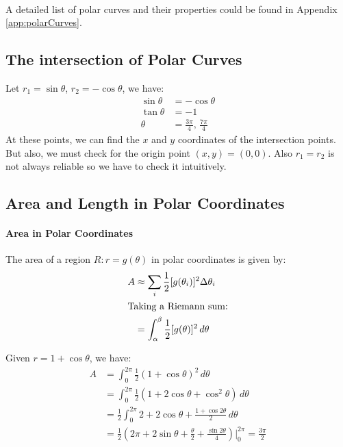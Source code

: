 \documentclass[11pt]{report}
\begin{document}
\paragraph{} \label{sec:polar} A detailed list of polar curves and their properties could be found in Appendix \ref{app:polarCurves}. 
\subsection{The intersection of Polar Curves}
\begin{example}
    Let $r_1 = \sin \theta$, $r_2 = -\cos \theta$, we have:
    \begin{align*}
        \sin \theta &= -\cos \theta \\
        \tan \theta &= -1 \\
        \theta &= \frac{3\pi}{4},\, \frac{7\pi}{4}
    \end{align*}
    At these points, we can find the $x$ and $y$ coordinates of the intersection points. But also, we must check for the origin point $(x,y) = (0,0)$. Also $r_1 = r_2$ is not always reliable so we have to check it intuitively.
\end{example}
\subsection{Area and Length in Polar Coordinates}
\paragraph{Area in Polar Coordinates} The area of a region $R: r = g(\theta)$ in polar coordinates is given by:
\begin{align}
    A &\approx \sum_{i} \frac{1}{2} [g(\theta_i)]^2 \Delta \theta_i \nonumber \\
    \intertext{Taking a Riemann sum:}
    &= \int_{\alpha}^{\beta} \frac{1}{2} [g(\theta)]^2 \, d\theta
\end{align}
\begin{example}
    Given $r = 1 + \cos \theta$, we have:
    \begin{align*}
        A &= \int_0^{2\pi} \frac{1}{2} (1 + \cos \theta)^2 \, d\theta \\
        &= \int_0^{2\pi} \frac{1}{2} (1 + 2\cos \theta + \cos^2 \theta) \, d\theta \\
        &= \frac{1}{2}\int_0^{2\pi} 2 + 2\cos \theta + \frac{1 + \cos 2\theta}{2} \, d\theta \\
        &= \frac{1}{2}\left(2\pi + 2\sin \theta + \frac{\theta}{2} + \frac{\sin 2\theta}{4}\right) \Big|_0^{2\pi}= \frac{3\pi}{2}
    \end{align*}
\end{example}
\end{document}
